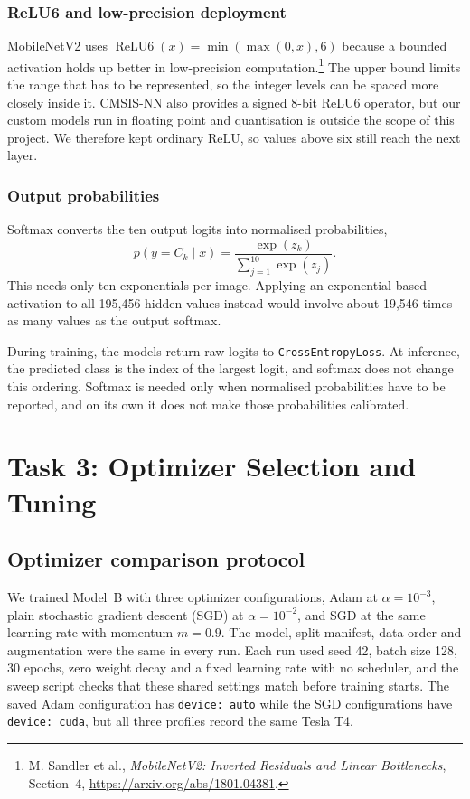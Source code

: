 \documentclass[11pt]{article}
\begin{document}
\subsubsection{ReLU6 and low-precision deployment}

MobileNetV2 uses
$\operatorname{ReLU6}(x)=\min(\max(0,x),6)$ because a bounded activation holds
up better in low-precision computation.\footnote{M. Sandler et al.,
\emph{MobileNetV2: Inverted Residuals and Linear Bottlenecks}, Section~4,
\url{https://arxiv.org/abs/1801.04381}.}
The upper bound limits the range that has to be represented, so the integer
levels can be spaced more closely inside it.  CMSIS-NN also provides a signed
8-bit ReLU6 operator, but our custom models run in floating point and
quantisation is outside the scope of this project.  We therefore kept ordinary
ReLU, so values above six still reach the next layer.

\subsubsection{Output probabilities}

Softmax converts the ten output logits into normalised probabilities,
\begin{equation}
  p(y=C_k\mid x)=\frac{\exp(z_k)}{\sum_{j=1}^{10}\exp(z_j)}.
\end{equation}
This needs only ten exponentials per image.  Applying an exponential-based
activation to all 195,456 hidden values instead would involve about 19,546
times as many values as the output softmax.

During training, the models return raw logits to \texttt{CrossEntropyLoss}.
At inference, the predicted class is the index of the largest logit, and
softmax does not change this ordering.  Softmax is needed only when normalised
probabilities have to be reported, and on its own it does not make those
probabilities calibrated.

\clearpage
\section{Task 3: Optimizer Selection and Tuning}
\label{sec:task3}
\subsection{Optimizer comparison protocol}
\label{sec:optimizer-comparison}

We trained Model~B with three optimizer configurations, Adam at
$\alpha=10^{-3}$, plain stochastic gradient descent (SGD) at
$\alpha=10^{-2}$, and SGD at the same learning rate with momentum $m=0.9$.
The model, split manifest, data order and augmentation were the same in every
run.  Each run used seed 42, batch size 128, 30 epochs, zero weight decay and
a fixed learning rate with no scheduler, and the sweep script checks that
these shared settings match before training starts.  The saved Adam
configuration has \texttt{device: auto} while the SGD configurations have
\texttt{device: cuda}, but all three profiles record the same Tesla T4.
\end{document}
